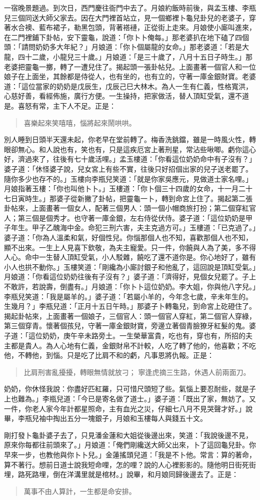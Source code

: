 一宿晚景題過。到次日，西門慶往衙門中去了。月娘約飯時前後，與孟玉樓、李瓶兒三個同送大師父家去。因在大門裡首站立，見一個鄉裡卜龜兒卦兒的老婆子，穿著水合襖、藍布裙子，勒黑包頭，背著褡褳，正從街上走來。月娘使小廝叫進來，在二門裡鋪下卦帖，安下靈龜，說道：「你卜卜俺每。」那老婆扒在地下磕了四個頭：「請問奶奶多大年紀？」月娘道：「你卜個屬龍的女命。」那老婆道：「若是大龍，四十二歲，小龍兒三十歲。」月娘道：「是三十歲了，八月十五日子時生。」那老婆把靈龜一擲，轉了一遭兒住了。揭起頭一張卦帖兒。上面畫著一個官人和一位娘子在上面坐，其餘都是侍從人，也有坐的，也有立的，守著一庫金銀財寶。老婆道：「這位當家的奶奶是戊辰生，戊辰己巳大林木。為人一生有仁義，性格寬洪，心慈好善，看經佈施，廣行方便。一生操持，把家做活，替人頂缸受氣，還不道是。喜怒有常，主下人不足。正是：
\begin{quote}
喜樂起來笑嘻嘻，惱將起來鬧哄哄。
\end{quote}
別人睡到日頭半天還未起，你老早在堂前轉了。梅香洗銚鐺，雖是一時風火性，轉眼卻無心。和人說也有，笑也有，只是這疾厄宮上著刑星，常沾些啾唧。虧你這心好，濟過來了，往後有七十歲活哩。」孟玉樓道：「你看這位奶奶命中有子沒有？」婆子道：「休怪婆子說，兒女宮上有些不實，往後只好招個出家的兒子送老罷了。隨你多少也存不的。」玉樓向李瓶兒笑道：「就是你家吳應元，見做道士家名哩。」月娘指著玉樓：「你也叫他卜卜。」玉樓道：「你卜個三十四歲的女命，十一月二十七日寅時生。」那婆子從新撇了卦帖，把靈龜一卜，轉到命宮上住了。揭起第二張卦帖來，上面畫著一個女人，配著三個男人：頭一個小帽商旅打扮；第二個穿紅官人；第三個是個秀才。也守著一庫金銀，左右侍從伏侍。婆子道：「這位奶奶是甲子年生。甲子乙醜海中金。命犯三刑六害，夫主克過方可。」玉樓道：「已克過了。」婆子道：「你為人溫柔和氣，好個性兒。你惱那個人也不知，喜歡那個人也不知，顯不出來。一生上人見喜下欽敬，為夫主寵愛。只一件，你饒與人為了美，多不得人心。命中一生替人頂缸受氣，小人駁雜，饒吃了還不道你是。你心地好了，雖有小人也拱不動你。」玉樓笑道：「剛纔為小廝討銀子和他亂了，這回說是頂缸受氣。」月娘道：「你看這位奶奶往後有子沒有？」婆子道：「濟得好，見個女兒罷了。子上不敢許，若說壽，倒盡有。」月娘道：「你卜卜這位奶奶。李大姐，你與他八字兒。」李瓶兒笑道：「我是屬羊的。」婆子道：「若屬小羊的，今年念七歲，辛未年生的。生幾月？」李瓶兒道：「正月十五日午時。」那婆子卜轉龜兒，到命宮上矻磴住了。揭起卦帖來，上面畫著一個娘子，三個官人：頭一個官人穿紅，第二個官人穿綠，第三個穿青。懷著個孩兒，守著一庫金銀財寶，旁邊立著個青臉獠牙紅髮的鬼。婆子道：「這位奶奶，庚午辛未路旁土。一生榮華富貴，吃也有，穿也有，所招的夫主都是貴人。為人心地有仁義，金銀財帛不計較，人吃了轉了他的，他喜歡；不吃他，不轉他，到惱。只是吃了比肩不和的虧，凡事恩將仇報。正是：
\begin{quote}
比肩刑害亂擾擾，轉眼無情就放刁；
寧逢虎摘三生路，休遇人前兩面刀。
\end{quote}
奶奶，你休怪我說：你盡好匹紅羅，只可惜尺頭短了些。氣惱上要忍耐些，就是子上也難為。」李瓶兒道：「今已是寄名做了道士。」婆子道：「既出了家，無妨了。又一件，你老人家今年計都星照命，主有血光之災，仔細七八月不見哭聲才好。」說畢，李瓶兒袖中掏出五分一塊銀子，月娘和玉樓每人與錢五十文。

剛打發卜龜卦婆子去了，只見潘金蓮和大姐從後邊出來，笑道：「我說後邊不見，原來你每都往前頭來了。」月娘道：「俺們剛纔送大師父出來，卜了這回龜兒卦。你早來一步，也教他與你卜卜兒。」金蓮搖頭兒道：「我是不卜他。常言：算的著命，算不著行。想前日道士說我短命哩，怎的哩？說的人心裡影影的。隨他明日街死街埋，路死路埋，倒在洋溝里就是棺材。」說畢，和月娘同歸後邊去了。正是：
\begin{quote}
萬事不由人算計，一生都是命安排。
\end{quote}
